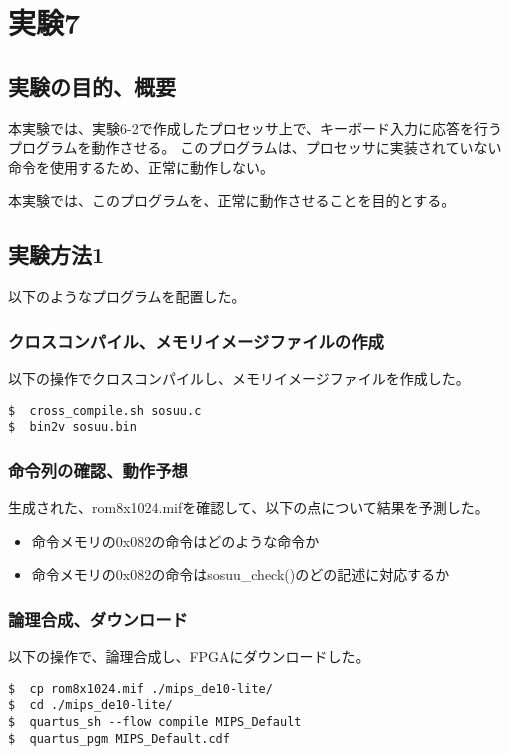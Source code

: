 \section{実験7}
\subsection{実験の目的、概要}
本実験では、実験6-2で作成したプロセッサ上で、キーボード入力に応答を行うプログラムを動作させる。
このプログラムは、プロセッサに実装されていない命令を使用するため、正常に動作しない。

本実験では、このプログラムを、正常に動作させることを目的とする。

\subsection{実験方法1}
以下のようなプログラムを配置した。


\subsubsection{クロスコンパイル、メモリイメージファイルの作成}
以下の操作でクロスコンパイルし、メモリイメージファイルを作成した。
\begin{lstlisting}[caption={クロスコンパイル、メモリイメージファイルの作成},label={クロスコンパイル、メモリイメージファイルの作成5-1}]
$  cross_compile.sh sosuu.c
$  bin2v sosuu.bin
\end{lstlisting}

\subsubsection{命令列の確認、動作予想}
生成された、rom8x1024.mifを確認して、以下の点について結果を予測した。
\begin{itemize}
  \item 命令メモリの0x082の命令はどのような命令か
  \item 命令メモリの0x082の命令はsosuu\_check()のどの記述に対応するか
\end{itemize}

\subsubsection{論理合成、ダウンロード}
以下の操作で、論理合成し、FPGAにダウンロードした。
\begin{lstlisting}[caption={論理合成、ダウンロード},label={論理合成、ダウンロード6-1}]
$  cp rom8x1024.mif ./mips_de10-lite/
$  cd ./mips_de10-lite/
$  quartus_sh --flow compile MIPS_Default
$  quartus_pgm MIPS_Default.cdf
\end{lstlisting}

